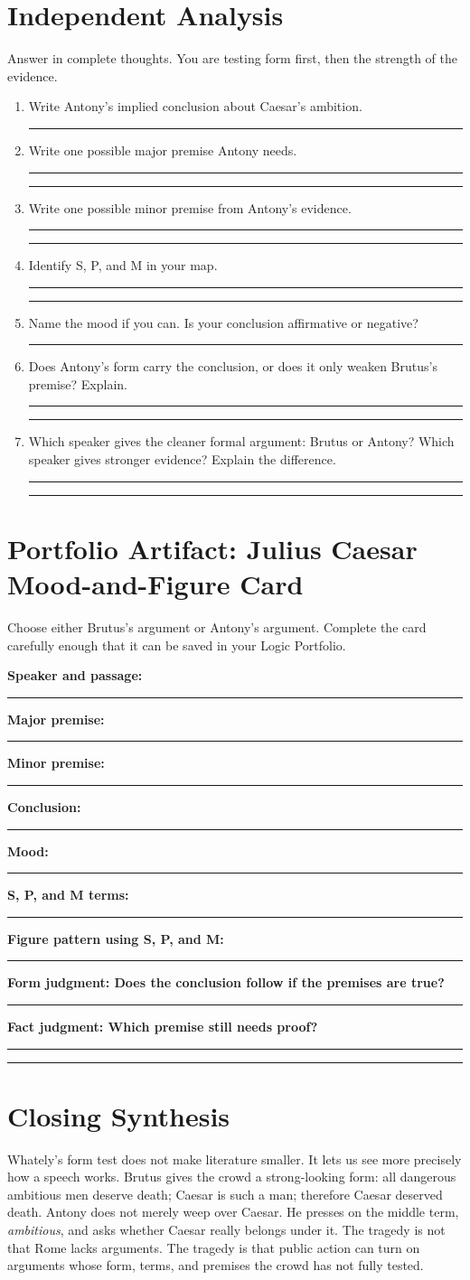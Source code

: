 \documentclass[12pt]{article}
\newcommand{\studentline}{\par\vspace{0.68em}\hrule\vspace{0.72em}}
\newcommand{\shortline}{\par\vspace{0.42em}\hrule\vspace{0.55em}}
\begin{document}
\section*{Independent Analysis}
Answer in complete thoughts. You are testing form first, then the strength of the evidence.

\begin{enumerate}[leftmargin=*]
\item Write Antony's implied conclusion about Caesar's ambition.\studentline
\item Write one possible major premise Antony needs.\studentline\studentline
\item Write one possible minor premise from Antony's evidence.\studentline\studentline
\item Identify S, P, and M in your map.\studentline\studentline
\item Name the mood if you can. Is your conclusion affirmative or negative?\studentline
\item Does Antony's form carry the conclusion, or does it only weaken Brutus's premise? Explain.\studentline\studentline
\item Which speaker gives the cleaner formal argument: Brutus or Antony? Which speaker gives stronger evidence? Explain the difference.\studentline\studentline
\end{enumerate}

\section*{Portfolio Artifact: Julius Caesar Mood-and-Figure Card}
Choose either Brutus's argument or Antony's argument. Complete the card carefully enough that it can be saved in your Logic Portfolio.

\textbf{Speaker and passage:}\studentline
\textbf{Major premise:}\studentline
\textbf{Minor premise:}\studentline
\textbf{Conclusion:}\studentline
\textbf{Mood:}\shortline
\textbf{S, P, and M terms:}\studentline
\textbf{Figure pattern using S, P, and M:}\studentline
\textbf{Form judgment: Does the conclusion follow if the premises are true?}\studentline
\textbf{Fact judgment: Which premise still needs proof?}\studentline\studentline

\section*{Closing Synthesis}
Whately's form test does not make literature smaller. It lets us see more precisely how a speech works. Brutus gives the crowd a strong-looking form: all dangerous ambitious men deserve death; Caesar is such a man; therefore Caesar deserved death. Antony does not merely weep over Caesar. He presses on the middle term, \textit{ambitious}, and asks whether Caesar really belongs under it. The tragedy is not that Rome lacks arguments. The tragedy is that public action can turn on arguments whose form, terms, and premises the crowd has not fully tested.
\end{document}
